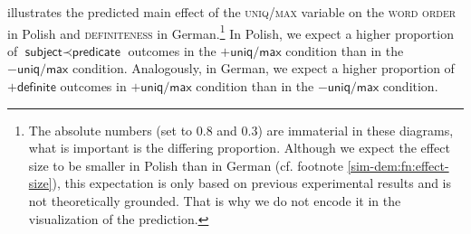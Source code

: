 \documentclass[output=paper]{langscibook}
\begin{document}
\noindent{} illustrates the predicted main effect of the \textsc{uniq/max} variable on the \textsc{word order} in Polish and \textsc{definiteness} in German.\footnote{The absolute numbers (set to $0.8$ and $0.3$) are immaterial in these diagrams, what is important is the differing proportion. Although we expect the effect size to be smaller in Polish than in German (cf. footnote \ref{sim-dem:fn:effect-size}), this expectation is only based on previous experimental results \citep{Simik.Demian2020} and is not theoretically grounded. That is why we do not encode it in the visualization of the prediction.\label{sim-dem:fn:prediction}} In Polish, we expect a higher proportion of $\textsf{subject}\prec\textsf{predicate}$ outcomes in the $+\textsf{uniq/max}$ condition than in the $-\textsf{uniq/max}$ condition. Analogously, in German, we expect a higher proportion of $+\textsf{definite}$ outcomes in $+\textsf{uniq/max}$ condition than in the $-\textsf{uniq/max}$ condition.

\end{document}
